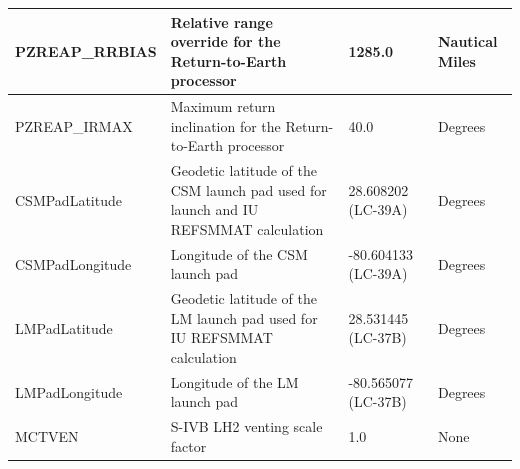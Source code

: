 \documentclass[11pt]{article} %
\begin{document}
\begin{tabular}{L{3cm} L{7.5cm} L{2cm} L{1.5cm}}
\hline
PZREAP\_RRBIAS & Relative range override for the Return-to-Earth processor & 1285.0 & Nautical Miles\\
\hline
PZREAP\_IRMAX & Maximum return inclination for the Return-to-Earth processor & 40.0 & Degrees\\
\hline
CSMPadLatitude & Geodetic latitude of the CSM launch pad used for launch and IU REFSMMAT calculation & 28.608202 (LC-39A) & Degrees\\
\hline
CSMPadLongitude & Longitude of the CSM launch pad & -80.604133 (LC-39A) & Degrees\\
\hline
LMPadLatitude & Geodetic latitude of the LM launch pad used for IU REFSMMAT calculation & 28.531445 (LC-37B) & Degrees\\
\hline
LMPadLongitude & Longitude of the LM launch pad & -80.565077 (LC-37B) & Degrees\\
\hline
MCTVEN & S-IVB LH2 venting scale factor & 1.0 & None\\
\hline
\end{tabular}
\end{document}
